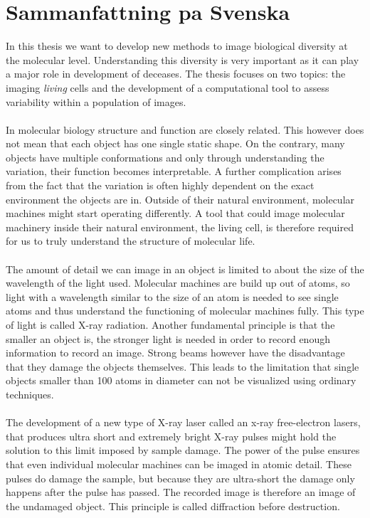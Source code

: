 \chapter{Sammanfattning pa Svenska}

In this thesis we want to develop new methods to image biological diversity at the molecular level. Understanding this diversity is very important as it can play a major role in development of deceases. The thesis focuses on two topics: the imaging \textit{living} cells and the development of a computational tool to assess variability within a population of images.
\\\\
In molecular biology structure and function are closely related. This however does not mean that each object has one single static shape. On the contrary, many objects have multiple conformations and only through understanding the variation, their function becomes interpretable. A further complication arises from the fact that the variation is often highly dependent on the exact environment the objects are in. Outside of their natural environment, molecular machines might start operating differently. A tool that could image molecular machinery inside their natural environment, the living cell, is therefore required for us to truly understand the structure of molecular life.
\\\\
The amount of detail we can image in an object is limited to about the size of the wavelength of the light used. Molecular machines are build up out of atoms, so light with a wavelength similar to the size of an atom is needed to see single atoms and thus understand the functioning of molecular machines fully. This type of light is called X-ray radiation. Another fundamental principle is that the smaller an object is, the stronger light is needed in order to record enough information to record an image. Strong beams however have the disadvantage that they damage the objects themselves. This leads to the limitation that single objects smaller than 100 atoms in diameter can not be visualized using ordinary techniques.
\\\\
The development of a new type of X-ray laser called an x-ray free-electron lasers, that produces ultra short and extremely bright X-ray pulses might hold the solution to this limit imposed by sample damage. The power of the pulse ensures that even individual molecular machines can be imaged in atomic detail. These pulses do damage the sample, but because they are ultra-short the damage only happens after the pulse has passed. The recorded image is therefore an image of the undamaged object. This principle is called diffraction before destruction. 
